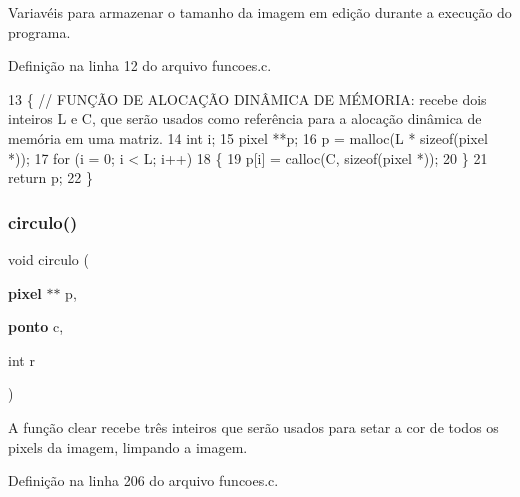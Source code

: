 Variavéis para armazenar o tamanho da imagem em edição durante a execução do programa. 



Definição na linha 12 do arquivo funcoes.\+c.


\begin{DoxyCode}
13 \{ \textcolor{comment}{// FUNÇÃO DE ALOCAÇÃO DINÂMICA DE MÉMORIA: recebe dois inteiros L e C, que serão usados como referência
       para a alocação dinâmica de memória em uma matriz.}
14     \textcolor{keywordtype}{int} i;
15     pixel **p;
16     p = malloc(L * \textcolor{keyword}{sizeof}(pixel *));
17     \textcolor{keywordflow}{for} (i = 0; i < L; i++)
18     \{
19         p[i] = calloc(C, \textcolor{keyword}{sizeof}(pixel *));
20     \}
21     \textcolor{keywordflow}{return} p;
22 \}
\end{DoxyCode}
\mbox{\label{funcoes_8h_ac35925b111e7fc9bd1743169eafc95df}} 
\subsubsection{circulo()}
{\footnotesize\ttfamily void circulo (\begin{DoxyParamCaption}\item[{\textbf{ pixel} $\ast$$\ast$}]{p,  }\item[{\textbf{ ponto}}]{c,  }\item[{int}]{r }\end{DoxyParamCaption})}



A função clear recebe três inteiros que serão usados para setar a cor de todos os pixels da imagem, limpando a imagem. 



Definição na linha 206 do arquivo funcoes.\+c.


